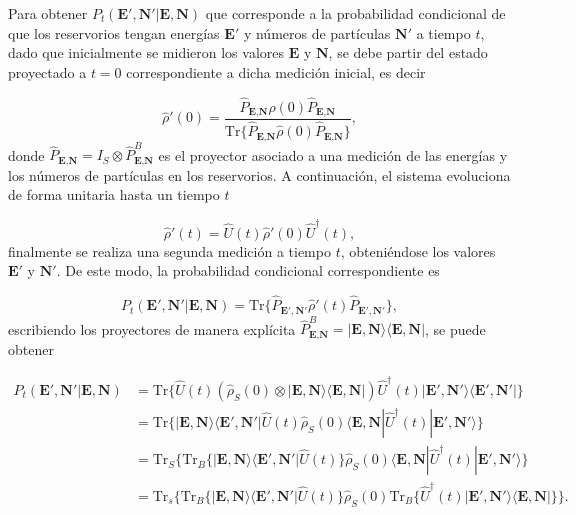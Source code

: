 Para obtener $P_{t}(\textbf{E}',\textbf{N}'|\textbf{E},\textbf{N})$ que corresponde a la probabilidad condicional de que los reservorios tengan energías $\textbf{E}'$ y números de partículas $\textbf{N}'$ a tiempo $t$, dado que inicialmente se midieron los valores $\textbf{E}$ y $\textbf{N}$, se debe partir del estado proyectado a $t=0$ correspondiente a dicha medición inicial, es decir

\begin{equation*}
    \hat{\rho}'(0) = \frac{\hat{P}_{\textbf{E}, \textbf{N} }\hat{\rho}(0) \hat{P}_{\textbf{E}, \textbf{N} } }{\text{Tr}\{\hat{P}_{\textbf{E}, \textbf{N} }\hat{\rho}(0) \hat{P}_{\textbf{E}, \textbf{N} } \} },
\end{equation*}
donde $\hat{P}_{\textbf{E}, \textbf{N} } = I_{S} \otimes \hat{P}^{B}_{\textbf{E}, \textbf{N} }$ es el proyector asociado a una medición de las energías y los números de partículas en los reservorios. A continuación, el sistema evoluciona de forma unitaria hasta un tiempo $t$

\begin{equation*}
    \hat{\rho}'(t) = \hat{U}(t)\hat{\rho}'(0)\hat{U}^{\dagger}(t),
\end{equation*}
finalmente se realiza una segunda medición a tiempo $t$, obteniéndose los valores $\textbf{E}'$ y $\textbf{N}'$. De este modo, la probabilidad condicional correspondiente es

\begin{equation*}
    P_{t}(\textbf{E}',\textbf{N}'|\textbf{E},\textbf{N}) = \text{Tr}\{\hat{P}_{\textbf{E}', \textbf{N}' }\hat{\rho}'(t) \hat{P}_{\textbf{E}', \textbf{N}' } \},
\end{equation*}
escribiendo los proyectores de manera explícita $\hat{P}^{B}_{\textbf{E}, \textbf{N} } = |\textbf{E}, \textbf{N} \rangle\langle \textbf{E}, \textbf{N}|$, se puede obtener 

\begin{align*} 
    P_{t}(\textbf{E}',\textbf{N}'|\textbf{E},\textbf{N}) & =  \text{Tr}\{\hat{U}(t)(\hat{\rho}_{S}(0)\otimes |\textbf{E}, \textbf{N}\rangle  \langle \textbf{E}, \textbf{N}| ) \hat{U}^{\dagger}(t)  |\textbf{E}', \textbf{N}'\rangle  \langle \textbf{E}', \textbf{N}'| \} \\
        & =  \text{Tr}\{|\textbf{E},\textbf{N} \rangle \langle \textbf{E}', \textbf{N}'| \hat{U}(t)\hat{\rho}_{S}(0) \langle \textbf{E}, \textbf{N}|\hat{U}^{\dagger}(t)|\textbf{E}', \textbf{N}'\rangle \}      \\ 
        & = \text{Tr}_{S}\{ \text{Tr}_{B}\{|\textbf{E},\textbf{N} \rangle \langle \textbf{E}', \textbf{N}'|\hat{U}(t) \}\hat{\rho}_{S}(0)\langle \textbf{E}, \textbf{N}|\hat{U}^{\dagger}(t)|\textbf{E}', \textbf{N}'\rangle      \} \\
        & = \text{Tr}_{s}\{ \text{Tr}_{B}\{|\textbf{E},\textbf{N}\rangle \langle \textbf{E}',\textbf{N}'|\hat{U}(t)  \} \hat{\rho}_{S}(0) \text{Tr}_{B}\{\hat{U}^{\dagger}(t) |\textbf{E}',\textbf{N}' \rangle \langle \textbf{E},\textbf{N}| \}     \}.
    \end{align*}    

